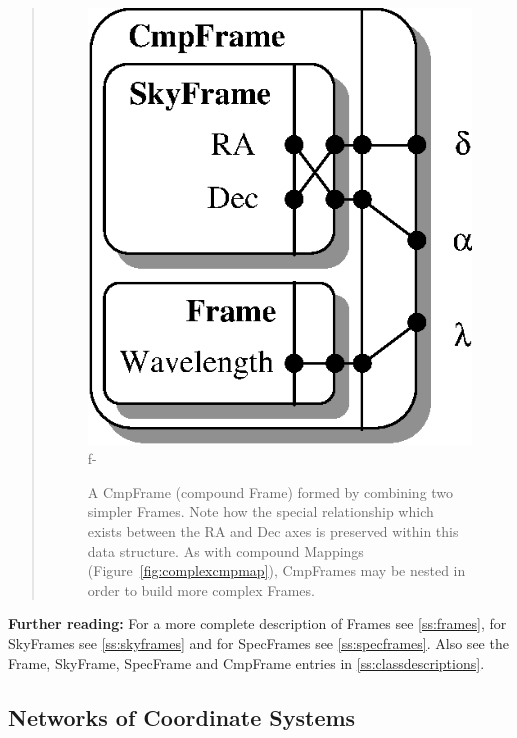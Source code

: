 \documentclass[twoside,11pt]{article}
\newcommand{\appref}[1]{Appendix~\ref{#1}}
\newcommand{\secref}[1]{\S\ref{#1}}
\renewcommand{\appref}[1]{\ref{#1}}
\renewcommand{\secref}[1]{\ref{#1}}
\begin{document}
\begin{htmlonly}
\begin{quote}
\begin{figure}
   \includegraphics[scale=1.5]{sun210_figures/cmpframe.eps}
f-
   \caption{A CmpFrame (compound Frame) formed by combining two simpler
   Frames. Note how the special relationship which exists between the RA
   and Dec axes is preserved within this data structure. As with compound
   Mappings (Figure~\ref{fig:complexcmpmap}), CmpFrames may be nested in
   order to build more complex Frames.}
   \end{figure}
   \end{quote}
\end{htmlonly}

{\bf{Further reading:}} For a more complete description of Frames see
\secref{ss:frames}, for SkyFrames see \secref{ss:skyframes} and for 
SpecFrames see \secref{ss:specframes}.  Also see the Frame, SkyFrame,
SpecFrame and CmpFrame entries in \appref{ss:classdescriptions}.

\subsection{Networks of Coordinate Systems}
\end{document}
